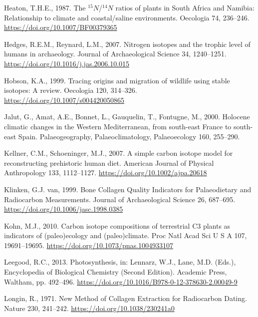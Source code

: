 \documentclass[preprint, 3p, authoryear]{elsarticle} %
\newlength{\cslhangindent}
\newlength{\cslentryspacingunit} %
\newenvironment{CSLReferences}[2] %
 {%
  \setlength{\parindent}{0pt}
  \ifodd #1
  \let\oldpar\par
  \def\par{\hangindent=\cslhangindent\oldpar}
  \fi
  \setlength{\parskip}{#2\cslentryspacingunit}
 }%
 {}
\begin{document}
\begin{CSLReferences}{1}{0}
\leavevmode{}%
Heaton, T.H.E., 1987. The \(^{15}N\)/\(^{14}N\) ratios of plants in {South Africa} and {Namibia}: Relationship to climate and coastal/saline environments. Oecologia 74, 236--246. \url{https://doi.org/10.1007/BF00379365}

\leavevmode{}%
Hedges, R.E.M., Reynard, L.M., 2007. Nitrogen isotopes and the trophic level of humans in archaeology. Journal of Archaeological Science 34, 1240--1251. \url{https://doi.org/10.1016/j.jas.2006.10.015}

\leavevmode{}%
Hobson, K.A., 1999. Tracing origins and migration of wildlife using stable isotopes: A review. Oecologia 120, 314--326. \url{https://doi.org/10.1007/s004420050865}

\leavevmode{}%
Jalut, G., Amat, A.E., Bonnet, L., Gauquelin, T., Fontugne, M., 2000. Holocene climatic changes in the {Western Mediterranean}, from south-east {France} to south-east {Spain}. Palaeogeography, Palaeoclimatology, Palaeoecology 160, 255--290.

\leavevmode{}%
Kellner, C.M., Schoeninger, M.J., 2007. A simple carbon isotope model for reconstructing prehistoric human diet. American Journal of Physical Anthropology 133, 1112--1127. \url{https://doi.org/10.1002/ajpa.20618}

\leavevmode{}%
Klinken, G.J. van, 1999. Bone {Collagen Quality Indicators} for {Palaeodietary} and {Radiocarbon Measurements}. Journal of Archaeological Science 26, 687--695. \url{https://doi.org/10.1006/jasc.1998.0385}

\leavevmode{}%
Kohn, M.J., 2010. Carbon isotope compositions of terrestrial {C3} plants as indicators of (paleo)ecology and (paleo)climate. Proc Natl Acad Sci U S A 107, 19691--19695. \url{https://doi.org/10.1073/pnas.1004933107}

\leavevmode{}%
Leegood, R.C., 2013. Photosynthesis, in: Lennarz, W.J., Lane, M.D. (Eds.), Encyclopedia of {Biological Chemistry} ({Second Edition}). {Academic Press}, {Waltham}, pp. 492--496. \url{https://doi.org/10.1016/B978-0-12-378630-2.00049-9}

\leavevmode{}%
Longin, R., 1971. New {Method} of {Collagen Extraction} for {Radiocarbon Dating}. Nature 230, 241--242. \url{https://doi.org/10.1038/230241a0}


\end{CSLReferences}
\end{document}
